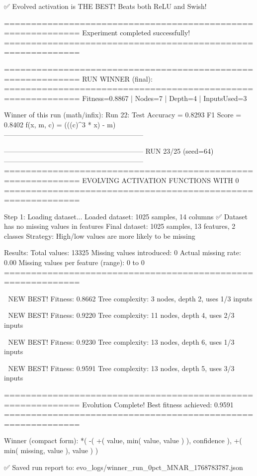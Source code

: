 ✅ Evolved activation is THE BEST! Beats both ReLU and Swish!

============================================================
Experiment completed successfully!
============================================================

============================================================
RUN WINNER (final):
============================================================
Fitness=0.8867 | Nodes=7 | Depth=4 | InputsUsed=3

Winner of this run (math/infix):
  Run 22:
     Test Accuracy = 0.8293
     F1 Score      = 0.8402
     f(x, m, c)    = (((c)^3 * x) - m)
------------------------------------------------------------

------------------------------------------------------------
RUN 23/25 (seed=64)
------------------------------------------------------------
============================================================
EVOLVING ACTIVATION FUNCTIONS
WITH 0%
============================================================

Step 1: Loading dataset...
Loaded dataset: 1025 samples, 14 columns
✅ Dataset has no missing values in features
Final dataset: 1025 samples, 13 features, 2 classes
Strategy: High/low values are more likely to be missing

Results:
  Total values: 13325
  Missing values introduced: 0
  Actual missing rate: 0.00%
  Missing values per feature (range): 0 to 0
============================================================


🎯 NEW BEST! Fitness: 0.8662
Tree complexity: 3 nodes, depth 2, uses 1/3 inputs

🎯 NEW BEST! Fitness: 0.9220
Tree complexity: 11 nodes, depth 4, uses 2/3 inputs

🎯 NEW BEST! Fitness: 0.9230
Tree complexity: 13 nodes, depth 6, uses 1/3 inputs

🎯 NEW BEST! Fitness: 0.9591
Tree complexity: 13 nodes, depth 5, uses 3/3 inputs

============================================================
Evolution Complete!
Best fitness achieved: 0.9591
============================================================

Winner (compact form):
 *(
  -(
    +(
      value,
      min(
        value,
        value
      )
    ),
    confidence
  ),
  +(
    min(
      missing,
      value
    ),
    value
  )
)

✅ Saved run report to: evo_logs/winner_run_0pct_MNAR_1768783787.json

